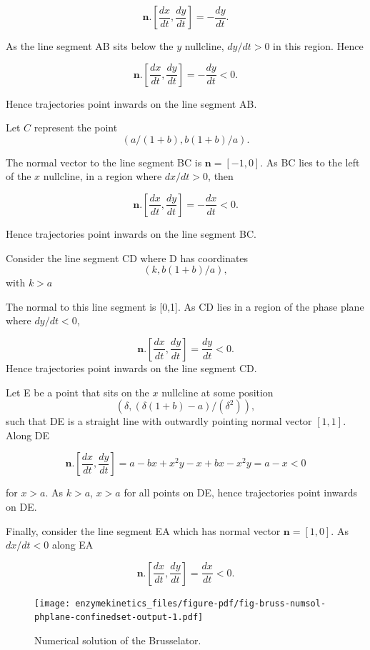\documentclass[
  letterpaper,
  DIV=11,
  numbers=noendperiod]{scrreprt}
\begin{document}
\[
\mathbf{n}.[\frac{dx}{dt},\frac{dy}{dt}] = -\frac{dy}{dt}.
\]

As the line segment AB sits below the \(y\) nullcline, \(dy/dt>0\) in
this region. Hence

\[
\mathbf{n}.[\frac{dx}{dt},\frac{dy}{dt}] = -\frac{dy}{dt}<0.
\]

Hence trajectories point inwards on the line segment AB.

Let \(C\) represent the point \[
(a/(1+b),b(1+b)/a).
\]

The normal vector to the line segment BC is \(\mathbf{n}=[-1,0]\). As BC
lies to the left of the \(x\) nullcline, in a region where \(dx/dt>0\),
then

\[
\mathbf{n}.[\frac{dx}{dt},\frac{dy}{dt}] = -\frac{dx}{dt}<0.
\]

Hence trajectories point inwards on the line segment BC.

Consider the line segment CD where D has coordinates \[
(k,b(1+b)/a),
\] with \(k>a\)

The normal to this line segment is {[}0,1{]}. As CD lies in a region of
the phase plane where \(dy/dt<0\),

\[
\mathbf{n}.[\frac{dx}{dt},\frac{dy}{dt}] = \frac{dy}{dt}<0.
\] Hence trajectories point inwards on the line segment CD.

Let E be a point that sits on the \(x\) nullcline at some position \[
(\delta,(\delta(1+b)-a)/(\delta^2)),
\] such that DE is a straight line with outwardly pointing normal vector
\([1,1]\). Along DE

\[
\mathbf{n}.[\frac{dx}{dt},\frac{dy}{dt}] =   a-bx+x^2y-x + bx-x^2y = a-x<0
\]

for \(x>a\). As \(k>a\), \(x>a\) for all points on DE, hence
trajectories point inwards on DE.

Finally, consider the line segment EA which has normal vector
\(\mathbf{n}=[1,0]\). As \(dx/dt<0\) along EA

\[
\mathbf{n}.[\frac{dx}{dt},\frac{dy}{dt}] =  \frac{dx}{dt} <0.
\]

\begin{figure}

{\centering \texttt{[image: enzymekinetics\_files/figure-pdf/fig-bruss-numsol-phplane-confinedset-output-1.pdf]}

}

\caption{\label{fig-bruss-numsol-phplane-confinedset}Numerical solution
of the Brusselator.}

\end{figure}
\end{document}
